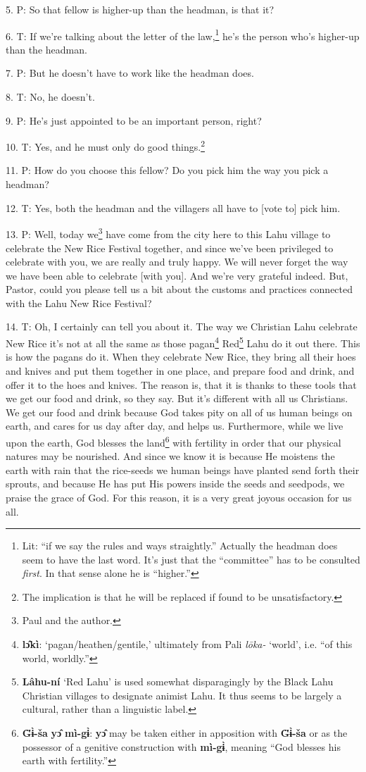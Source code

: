 5. P: So that fellow is higher-up than the headman, is that it?

6. T: If we're talking about the letter of the law,\footnote{Lit: ``if we say the rules and ways straightly.'' Actually the headman does seem to have the last word. It's just that the ``committee'' has to be consulted \textit{first}. In that sense alone he is ``higher.''} he's the person who's higher-up
than the headman.

7. P: But he doesn't have to work like the headman does.

8. T: No, he doesn't.

9. P: He's just appointed to be an important person, right?

10. T: Yes, and he must only do good things.\footnote{The implication is that he will be replaced if found to be unsatisfactory.}

11. P: How do you choose this fellow? Do you pick him the way you pick a headman?

12. T: Yes, both the headman and the villagers all have to [vote to] pick him.

13. P:  Well, today we\footnote{Paul and the author.} have come from
the city here to this Lahu village to celebrate the New Rice Festival together,
and since we've been privileged to celebrate with you, we are really and truly
happy. We will never forget the way we have been able to celebrate [with you].
And we're very grateful indeed. But, Pastor, could you please tell us a bit about
the customs and practices connected with the Lahu New Rice Festival?

14. T: Oh, I certainly can tell you about it. The way we Christian Lahu celebrate
New Rice it's not at all the same as those pagan\footnote{\textbf{lɔ̂kì}: `pagan/heathen/gentile,' ultimately from Pali \textit{lōka-} `world', i.e. ``of this world, worldly.''} Red\footnote{\textbf{Lâhu-ní} `Red Lahu' is used somewhat disparagingly by the Black Lahu Christian villages to designate animist Lahu. It thus seems to be largely a cultural, rather than a linguistic label.} Lahu do it out there.
This is how the pagans do it. When they celebrate New Rice, they bring all their
hoes and knives and put them together in one place, and prepare food and drink,
and offer it to the hoes and knives. The reason is, that it is thanks to these
tools that we get our food and drink, so they say. But it's different with all
us Christians. We get our food and drink because God takes pity on all of us human
beings on earth, and cares for us day after day, and helps us. Furthermore, while
we live upon the earth, God blesses the land\footnote{\textbf{G̈ɨ̀-ša} \textbf{yɔ̂} \textbf{mì-gɨ̀}: \textbf{yɔ̂} may be taken either in apposition with \textbf{G̈ɨ̀-ša} or as the possessor of a genitive construction with \textbf{mì-gɨ̀}, meaning ``God blesses his earth with fertility.''} with fertility in order that our
physical natures may be nourished. And since we know it is because He moistens
the earth with rain that the rice-seeds we human beings have planted send forth
their sprouts, and because He has put His powers inside the seeds and seedpods,
we praise the grace of God. For this reason, it is a very great joyous occasion
for us all.

